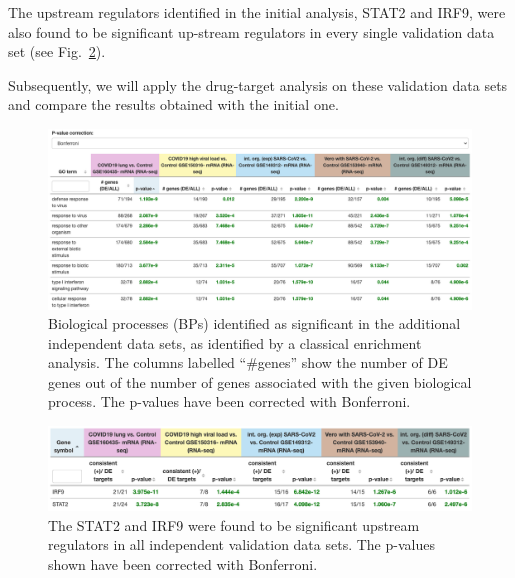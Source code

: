 The upstream regulators identified in the initial analysis, STAT2 and IRF9, were also found to be significant up-stream regulators in every single validation data set (see Fig.~\ref{Supp:STAT2-IRF9validation}).

Subsequently, we will apply the drug-target analysis on these validation data sets and compare the results obtained with the initial one. 

\begin{figure}
\centering
	\includegraphics[width=1\linewidth]{Figures/BPs_in_common_(Bonferroni)_in_additional_datasets.png}
    \caption{Biological processes (BPs) identified as significant in the additional independent data sets, as identified by a classical enrichment analysis. The  columns labelled ``\#genes'' show the number of DE genes out of the number of genes associated with the given biological process. The p-values have been corrected with Bonferroni. }
        \label{Supp:BPs_validation} 
\end{figure}

\begin{figure}
\centering
	\includegraphics[width=1\linewidth]{Figures/STAT2-IRF9validation.png}
    \caption{The STAT2 and IRF9 were found to be significant upstream regulators in all independent validation data sets. The p-values shown have been corrected with Bonferroni.}
        \label{Supp:STAT2-IRF9validation}
\end{figure}


